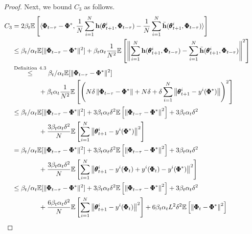 \documentclass{article} %
\theoremstyle{plain}
\theoremstyle{definition}
\theoremstyle{remark}
\begin{document}
{\begin{proof}
Next, we bound $C_3$ as follows.
\begin{align*}
    C_3&=2\beta_t\mathbb{E}\left[\langle\pmb{\Phi}_{t-\tau}-\pmb{\Phi}^*, \frac{1}{N}\sum_{i=1}^N\bh(\pmb{\theta}_{t+1}^i, \pmb{\Phi}_{t-\tau})- \frac{1}{N}\sum_{i=1}^N\bar{\bh}(\pmb{\theta}_{t+1}^i, \pmb{\Phi}_{t-\tau})\rangle\right]\allowdisplaybreaks\\
    &\leq\beta_t/\alpha_t\mathbb{E}[\|\pmb{\Phi}_{t-\tau}-\pmb{\Phi}^*\|^2]+\beta_t\alpha_t\frac{1}{N^2}\mathbb{E}\left[\left\|\sum_{i=1}^N\bh(\pmb{\theta}_{t+1}^i, \pmb{\Phi}_{t-\tau})- \sum_{i=1}^N\bar{\bh}(\pmb{\theta}_{t+1}^i, \pmb{\Phi}_{t-\tau})\right\|^2\right]\allowdisplaybreaks\\
    &\overset{\text{Definition}~4.3}{\leq}\beta_t/\alpha_t\mathbb{E}[\|\pmb{\Phi}_{t-\tau}-\pmb{\Phi}^*\|^2]\allowdisplaybreaks\\
    &\qquad\qquad+\beta_t\alpha_t\frac{1}{N^2}\mathbb{E}\left[\left(N\delta\left\|\pmb{\Phi}_{t-\tau}-\pmb{\Phi}^*\right\|+N\delta+\delta\sum_{i=1}^N\left\|\pmb{\theta}_{t+1}^i-y^i(\pmb{\Phi}^*)\right\|\right)^2\right]\allowdisplaybreaks\\
    &\leq\beta_t/\alpha_t\mathbb{E}[\|\pmb{\Phi}_{t-\tau}-\pmb{\Phi}^*\|^2]+3\beta_t\alpha_t\delta^2\mathbb{E}\left[\left\|\pmb{\Phi}_{t-\tau}-\pmb{\Phi}^*\right\|^2\right]+3\beta_t\alpha_t\delta^2\allowdisplaybreaks\\
    &\qquad\qquad+\frac{3\beta_t\alpha_t\delta^2}{N}\mathbb{E}\left[\sum_{i=1}^N\left\|\pmb{\theta}_{t+1}^i-y^i(\pmb{\Phi}^*)\right\|^2\right]\allowdisplaybreaks\\
    &=\beta_t/\alpha_t\mathbb{E}[\|\pmb{\Phi}_{t-\tau}-\pmb{\Phi}^*\|^2]+3\beta_t\alpha_t\delta^2\mathbb{E}\left[\left\|\pmb{\Phi}_{t-\tau}-\pmb{\Phi}^*\right\|^2\right]+3\beta_t\alpha_t\delta^2\nonumber\allowdisplaybreaks\\
    &\qquad\qquad+\frac{3\beta_t\alpha_t\delta^2}{N}\mathbb{E}\left[\sum_{i=1}^N\left\|\pmb{\theta}_{t+1}^i-y^i(\pmb{\Phi}_t)+y^i(\pmb{\Phi}_t)-y^i(\pmb{\Phi}^*)\right\|^2\right]\allowdisplaybreaks\\
    &\leq\beta_t/\alpha_t\mathbb{E}[\|\pmb{\Phi}_{t-\tau}-\pmb{\Phi}^*\|^2]+3\beta_t\alpha_t\delta^2\mathbb{E}\left[\left\|\pmb{\Phi}_{t-\tau}-\pmb{\Phi}^*\right\|^2\right]+3\beta_t\alpha_t\delta^2\allowdisplaybreaks\\
    &\qquad\qquad+\frac{6\beta_t\alpha_t\delta^2}{N}\mathbb{E}\left[\sum_{i=1}^N\left\|\pmb{\theta}_{t+1}^i-y^i(\pmb{\Phi}_t)\right\|^2\right]+{6\beta_t\alpha_tL^2\delta^2}\mathbb{E}\left[\left\|\pmb{\Phi}_t-\pmb{\Phi}^*\right\|^2\right]\allowdisplaybreaks\\

\end{align*}
\end{proof}}
\end{document}
